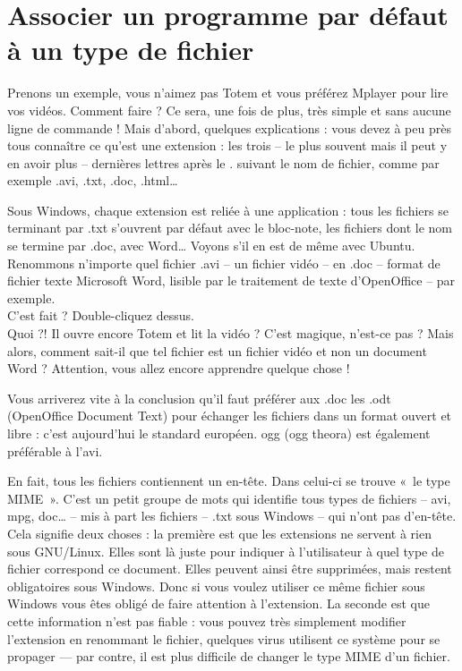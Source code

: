 \section{Associer un programme par défaut à un type de fichier}
\label{RefAssoceFichierApplication}
Prenons un exemple, vous n'aimez pas Totem et vous préférez Mplayer pour lire vos vidéos. Comment faire ? Ce sera, une fois de plus, très simple et sans aucune ligne de commande ! Mais d'abord, quelques explications : vous devez à peu près tous connaître ce qu'est une extension : les trois -- le plus souvent mais il peut y en avoir plus -- dernières lettres après le . suivant le nom de fichier, comme par exemple .avi, .txt, .doc, .html\ldots{}\par
Sous Windows, chaque extension est reliée à une application : tous les fichiers se terminant par .txt s'ouvrent par défaut avec le bloc-note, les fichiers dont le nom se termine par .doc, avec Word\ldots{} Voyons s'il en est de même avec Ubuntu. Renommons n'importe quel fichier .avi -- un fichier vidéo -- en .doc -- format de fichier texte Microsoft Word, lisible par le traitement de texte d'OpenOffice -- par exemple.\\
C'est fait ? Double-cliquez dessus.\\
Quoi ?! Il ouvre encore Totem et lit la vidéo ? C'est magique, n'est-ce pas ? Mais alors, comment sait-il que tel fichier est un fichier vidéo et non un document Word ? Attention, vous allez encore apprendre quelque chose !\par
\begin{nota}
Vous arriverez vite à la conclusion qu'il faut préférer aux .doc les .odt (OpenOffice Document Text) pour échanger les fichiers dans un format ouvert et libre : c'est aujourd'hui le standard européen. ogg (ogg theora) est également préférable à l'avi.
\end{nota}
En fait, tous les fichiers contiennent un en-tête. Dans celui-ci se trouve «~le type MIME~». C'est un petit groupe de mots qui identifie tous types de fichiers -- avi, mpg, doc\ldots{} -- mis à part les fichiers  -- .txt sous Windows -- qui n'ont pas d'en-tête. Cela signifie deux choses : la première est que les extensions ne servent à rien sous GNU/Linux. Elles sont là juste pour indiquer à l'utilisateur à quel type de fichier correspond ce document. Elles peuvent ainsi être supprimées, mais restent obligatoires sous Windows. Donc si vous voulez utiliser ce même fichier sous Windows vous êtes obligé de faire attention à l'extension. La seconde est que cette information n'est pas fiable : vous pouvez très simplement modifier l'extension en renommant le fichier, quelques virus utilisent ce système pour se propager --- par contre, il est plus difficile de changer le type MIME d'un fichier.\par
